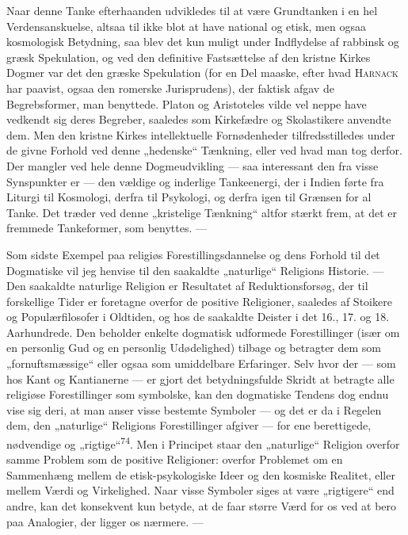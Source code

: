 \documentclass[12pt,a4paper,openany]{book}
\newcommand{\opage}[1]{\marginnote{\footnotesize\textit{[#1]}}}
\begin{document}
Naar denne Tanke efterhaanden udvikledes til at være Grundtanken i en
hel Verdensanskuelse, altsaa til ikke blot at have national og etisk,
men ogsaa kosmologisk Betydning, saa blev det kun muligt under
Indflydelse af rabbinsk og græsk Spekulation, og ved den definitive
Fastsættelse af den kristne Kirkes Dogmer var det den græske Spekulation
(for en Del maaske, efter hvad \textsc{Harnack} har paavist, ogsaa den
romerske Jurisprudens), der faktisk afgav de Begrebsformer, man
benyttede. Platon og Aristoteles vilde vel neppe have vedkendt sig deres
Begreber, saaledes som Kirkefædre og Skolastikere anvendte dem. Men den
kristne Kirkes intellektuelle Fornødenheder tilfredsstilledes under de
givne Forhold ved denne „hedenske“ Tænkning, eller ved hvad man tog
derfor. Der mangler ved hele denne Dogmeudvikling --- saa interessant
den fra visse Synspunkter er --- den vældige og inderlige Tankeenergi,
der i Indien førte fra Liturgi til Kosmologi, derfra til Psykologi, og
derfra igen til Grænsen for al Tanke. Det træder ved denne „kristelige
Tænkning“ altfor stærkt frem, at det er fremmede Tankeformer, som
benyttes. ---

Som sidste Exempel paa religiøs Forestillingsdannelse og dens Forhold
til det Dogmatiske vil jeg henvise til den saakaldte „naturlige“
Religions Historie. --- Den saakaldte naturlige Religion er Resultatet
af Reduktionsforsøg, der til forskellige Tider er foretagne overfor de
positive Religioner, saaledes af Stoikere og Populærfilosofer i
Oldtiden, og hos de saakaldte Deister i det 16., 17. og 18. Aarhundrede.
Den beholder enkelte dogmatisk udformede Forestillinger (især om en
personlig Gud og en personlig Udødelighed) tilbage og betragter dem som
„fornuftsmæssige“ eller ogsaa som umiddelbare Erfaringer. Selv hvor der
--- som
\opage{144}hos Kant og Kantianerne --- er gjort det betydningsfulde
Skridt at betragte alle religiøse Forestillinger som symbolske, kan den
dogmatiske Tendens dog endnu vise sig deri, at man anser visse bestemte
Symboler --- og det er da i Regelen dem, den „naturlige“ Religions
Forestillinger afgiver --- for ene berettigede, nødvendige og
„rigtige“\textsuperscript{74}. Men i Principet staar den „naturlige“
Religion overfor samme Problem som de positive Religioner: overfor
Problemet om en Sammenhæng mellem de etisk-psykologiske Ideer og den
kosmiske Realitet, eller mellem Værdi og Virkelighed. Naar visse
Symboler siges at være „rigtigere“ end andre, kan det konsekvent kun
betyde, at de faar større Værd for os ved at bero paa Analogier, der
ligger os nærmere. ---
\end{document}
